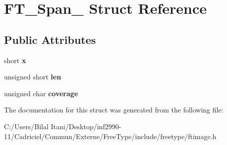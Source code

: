 \hypertarget{struct_f_t___span__}{}\section{F\+T\+\_\+\+Span\+\_\+ Struct Reference}
\label{struct_f_t___span__}
\subsection*{Public Attributes}
\begin{DoxyCompactItemize}
\item 
short {\bfseries x}\hypertarget{struct_f_t___span___a7f7235a404c66398b49c50fa09691ba5}{}\label{struct_f_t___span___a7f7235a404c66398b49c50fa09691ba5}

\item 
unsigned short {\bfseries len}\hypertarget{struct_f_t___span___a939c84317f25a97d0ba01704591a4d38}{}\label{struct_f_t___span___a939c84317f25a97d0ba01704591a4d38}

\item 
unsigned char {\bfseries coverage}\hypertarget{struct_f_t___span___a70f9c9e0e8d3f0b38adee03a508ae214}{}\label{struct_f_t___span___a70f9c9e0e8d3f0b38adee03a508ae214}

\end{DoxyCompactItemize}


The documentation for this struct was generated from the following file\+:\begin{DoxyCompactItemize}
\item 
C\+:/\+Users/\+Bilal Itani/\+Desktop/inf2990-\/11/\+Cadriciel/\+Commun/\+Externe/\+Free\+Type/include/freetype/ftimage.\+h\end{DoxyCompactItemize}
